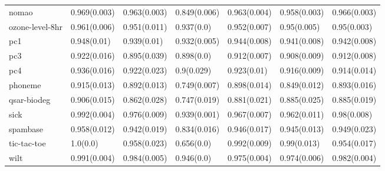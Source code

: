 \begin{tabular}{lllllll}
nomao & 0.969(0.003) & 0.963(0.003) & 0.849(0.006) & 0.963(0.004) & 0.958(0.003) & 0.966(0.003) \\
ozone-level-8hr & 0.961(0.006) & 0.951(0.011) & 0.937(0.0) & 0.952(0.007) & 0.95(0.005) & 0.95(0.003) \\
pc1 & 0.948(0.01) & 0.939(0.01) & 0.932(0.005) & 0.944(0.008) & 0.941(0.008) & 0.942(0.008) \\
pc3 & 0.922(0.016) & 0.895(0.039) & 0.898(0.0) & 0.912(0.007) & 0.908(0.009) & 0.912(0.008) \\
pc4 & 0.936(0.016) & 0.922(0.023) & 0.9(0.029) & 0.923(0.01) & 0.916(0.009) & 0.914(0.014) \\
phoneme & 0.915(0.013) & 0.892(0.013) & 0.749(0.007) & 0.898(0.014) & 0.849(0.012) & 0.893(0.016) \\
qsar-biodeg & 0.906(0.015) & 0.862(0.028) & 0.747(0.019) & 0.881(0.021) & 0.885(0.025) & 0.885(0.019) \\
sick & 0.992(0.004) & 0.976(0.009) & 0.939(0.001) & 0.967(0.007) & 0.962(0.011) & 0.98(0.008) \\
spambase & 0.958(0.012) & 0.942(0.019) & 0.834(0.016) & 0.946(0.017) & 0.945(0.013) & 0.949(0.023) \\
tic-tac-toe & 1.0(0.0) & 0.958(0.023) & 0.656(0.0) & 0.992(0.009) & 0.99(0.013) & 0.954(0.017) \\
wilt & 0.991(0.004) & 0.984(0.005) & 0.946(0.0) & 0.975(0.004) & 0.974(0.006) & 0.982(0.004) \\
\bottomrule
\end{tabular}
